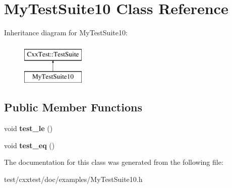 \hypertarget{classMyTestSuite10}{\section{My\-Test\-Suite10 Class Reference}
\label{classMyTestSuite10}
}
Inheritance diagram for My\-Test\-Suite10\-:\begin{figure}[H]
\begin{center}
\leavevmode
\includegraphics[height=2.000000cm]{classMyTestSuite10}
\end{center}
\end{figure}
\subsection*{Public Member Functions}
\begin{DoxyCompactItemize}
\item 
\hypertarget{classMyTestSuite10_a335a27712cf5b64f1f0861ab6ffb7d50}{void {\bfseries test\-\_\-le} ()}\label{classMyTestSuite10_a335a27712cf5b64f1f0861ab6ffb7d50}

\item 
\hypertarget{classMyTestSuite10_ab067e1b901d45474e5de268a6f912b72}{void {\bfseries test\-\_\-eq} ()}\label{classMyTestSuite10_ab067e1b901d45474e5de268a6f912b72}

\end{DoxyCompactItemize}


The documentation for this class was generated from the following file\-:\begin{DoxyCompactItemize}
\item 
test/cxxtest/doc/examples/My\-Test\-Suite10.\-h\end{DoxyCompactItemize}
